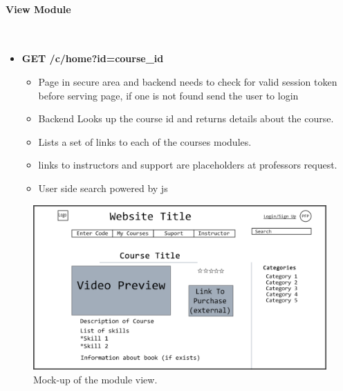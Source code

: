 \documentclass{article}
\begin{document}
\paragraph{View Module}\\
\begin{itemize}
    \item \textbf{GET /c/home?id=course_id}
        \begin{itemize}
        \item Page in secure area and backend needs to check for valid session token before serving page, if one is not found send the user to login
        \item Backend Looks up the course id and returns details about the course.
        \item Lists a set of links to each of the courses modules.
        \item links to instructors and support are placeholders at professors request.
        \item User side search powered by js
    \end{itemize}
\end{itemize}
\begin{figure}[h]
    \caption{Mock-up of the module view.}
    \includegraphics[width=\textwidth]{course_preview}
\end{figure}
\end{document}
